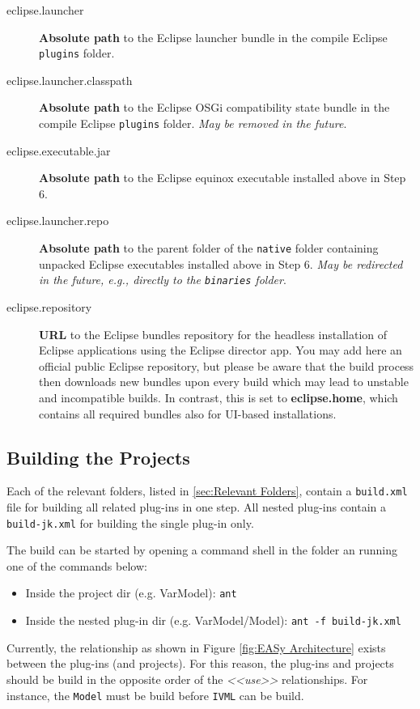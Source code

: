 \begin{description}
\begin{description}
	\end{description}
	\item[eclipse.launcher] $ $\\
	    \textbf{Absolute path} to the Eclipse launcher bundle in the compile Eclipse \texttt{plugins} folder. 
      \item[eclipse.launcher.classpath] $ $\\
           \textbf{Absolute path} to the Eclipse OSGi compatibility state bundle in the compile Eclipse \texttt{plugins} folder. \textit{May be removed in the future}.
      \item[eclipse.executable.jar] $ $\\
           \textbf{Absolute path} to the Eclipse equinox executable installed above in Step 6.
      \item[eclipse.launcher.repo] $ $\\
           \textbf{Absolute path} to the parent folder of the \texttt{native} folder containing unpacked Eclipse executables installed above in Step 6. \textit{May be redirected in the future, e.g., directly to the \texttt{binaries} folder}.
      \item[eclipse.repository] $ $\\
           \textbf{URL} to the Eclipse bundles repository for the headless installation of Eclipse applications using the Eclipse director app. You may add here an official public Eclipse repository, but please be aware that the build process then downloads new bundles upon every build which may lead to unstable and incompatible builds. In contrast, this is set to \textbf{eclipse.home}, which contains all required bundles also for UI-based installations.
\end{description}

\subsection{Building the Projects}
\label{sec:Local Build}
Each of the relevant folders, listed in \vref{sec:Relevant Folders}, contain a \texttt{build.xml} file for building all related plug-ins in one step. All nested plug-ins contain a \texttt{build-jk.xml} for building the single plug-in only.

The build can be started by opening a command shell in the folder an running one of the commands below:
\begin{itemize}
	\item Inside the project dir (e.g. VarModel): \texttt{ant}
	\item Inside the nested plug-in dir (e.g. VarModel/Model): \texttt{ant -f build-jk.xml}
\end{itemize}

Currently, the relationship as shown in Figure \vref{fig:EASy Architecture} exists between the plug-ins (and projects). For this reason, the plug-ins and projects should be build in the opposite order of the \textit{<<use>>} relationships. For instance, the \texttt{Model} must be build before \texttt{IVML} can be build.
